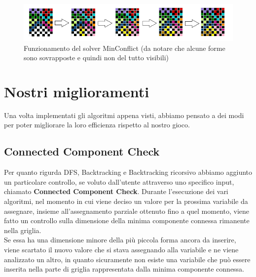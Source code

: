 \begin{figure}[h]
	\centering
	\includegraphics[scale=0.75]{immagini/mc}
	\caption{Funzionamento del solver MinConflict (da notare che alcune forme sono sovrapposte e quindi non del tutto visibili)}
	\label{fig:mc}
\end{figure}


\newpage
\section{Nostri miglioramenti}
\label{migliorie}
Una volta implementati gli algoritmi appena visti, abbiamo pensato a dei modi per poter migliorare la loro efficienza rispetto al nostro gioco. \\

\subsection{Connected Component Check}
Per quanto rigurda DFS, Backtracking e Backtracking ricorsivo abbiamo aggiunto un particolare controllo, se voluto dall'utente attraverso uno specifico input, chiamato \textbf{Connected Component Check}.
Durante l'esecuzione dei vari algoritmi, nel momento in cui viene deciso un valore per la prossima variabile da assegnare, insieme all'assegnamento parziale ottenuto fino a quel momento, viene fatto un controllo sulla dimensione della minima componente connessa rimanente nella griglia. \\
Se essa ha una dimensione minore della più piccola forma ancora da inserire, viene scartato il nuovo valore che si stava assegnando alla variabile e ne viene analizzato un altro, in quanto sicuramente non esiste una variabile che può essere inserita nella parte di griglia rappresentata dalla minima componente connessa. 

